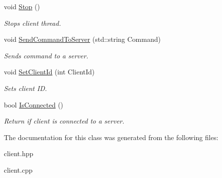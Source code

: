 \begin{DoxyCompactItemize}
\mbox{\label{classtfp_1_1_network_client_a8753f0074647aa3596aece10ebb90796}} 
void \mbox{\hyperlink{classtfp_1_1_network_client_a8753f0074647aa3596aece10ebb90796}{Stop}} ()
\begin{DoxyCompactList}\small\item\em Stops client thread. \end{DoxyCompactList}\item 
\mbox{\label{classtfp_1_1_network_client_ac161ba71ecfdc85a870b5d49e6e5e1a5}} 
void \mbox{\hyperlink{classtfp_1_1_network_client_ac161ba71ecfdc85a870b5d49e6e5e1a5}{Send\+Command\+To\+Server}} (std\+::string Command)
\begin{DoxyCompactList}\small\item\em Sends command to a server. \end{DoxyCompactList}\item 
\mbox{\label{classtfp_1_1_network_client_aff643ad46db23b639bd177832848f1a0}} 
void \mbox{\hyperlink{classtfp_1_1_network_client_aff643ad46db23b639bd177832848f1a0}{Set\+Client\+Id}} (int Client\+Id)
\begin{DoxyCompactList}\small\item\em Sets client ID. \end{DoxyCompactList}\item 
\mbox{\label{classtfp_1_1_network_client_a715cef2522038f12b712e5c5ea93d5c0}} 
bool \mbox{\hyperlink{classtfp_1_1_network_client_a715cef2522038f12b712e5c5ea93d5c0}{Is\+Connected}} ()
\begin{DoxyCompactList}\small\item\em Return if client is connected to a server. \end{DoxyCompactList}\end{DoxyCompactItemize}


The documentation for this class was generated from the following files\+:\begin{DoxyCompactItemize}
\item 
client.\+hpp\item 
client.\+cpp\end{DoxyCompactItemize}
